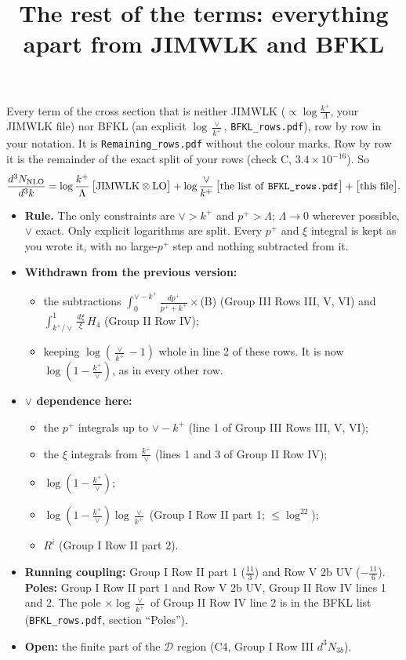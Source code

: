 \documentclass[10pt]{article}
\title{The rest of the terms: everything apart from JIMWLK and BFKL}
\date{}
\numberwithin{equation}{section}
\begin{document}
\maketitle
\noindent Every term of the cross section that is neither JIMWLK ($\propto\log\frac{k^+}{\Lambda}$, your JIMWLK file) nor BFKL (an explicit $\log\frac{\vee}{k^+}$, \texttt{BFKL\_rows.pdf}), row by row in your notation. It is \texttt{Remaining\_rows.pdf} without the colour marks. Row by row it is the remainder of the exact split of your rows (check C, $3.4\times10^{-16}$). So
\begin{equation*}
\frac{d^3N_{\rm NLO}}{d^3k}=\log\frac{k^+}{\Lambda}\,\big[\text{JIMWLK}\otimes\text{LO}\big]+\log\frac{\vee}{k^+}\,\big[\text{the list of \texttt{BFKL\_rows.pdf}}\big]+\big[\text{this file}\big].
\end{equation*}
\begin{itemize}
\item \textbf{Rule.} The only constraints are $\vee>k^+$ and $p^+>\Lambda$; $\Lambda\to0$ wherever possible, $\vee$ exact. Only explicit logarithms are split. Every $p^+$ and $\xi$ integral is kept as you wrote it, with no large-$p^+$ step and nothing subtracted from it.
\item \textbf{Withdrawn from the previous version:}
\begin{itemize}
\item the subtractions $\int_0^{\vee-k^+}\frac{dp^+}{p^++k^+}\times$(B) (Group III Rows III, V, VI) and $\int_{k^+/\vee}^1\frac{d\xi}{\xi}\,H_4$ (Group II Row IV);
\item keeping $\log(\frac{\vee}{k^+}-1)$ whole in line 2 of these rows. It is now $\log(1-\frac{k^+}{\vee})$, as in every other row.
\end{itemize}
\item \textbf{$\vee$ dependence here:}
\begin{itemize}
\item the $p^+$ integrals up to $\vee-k^+$ (line 1 of Group III Rows III, V, VI);
\item the $\xi$ integrals from $\frac{k^+}{\vee}$ (lines 1 and 3 of Group II Row IV);
\item $\log(1-\frac{k^+}{\vee})$;
\item $\log(1-\frac{k^+}{\vee})\log\frac{\vee}{k^+}$ (Group I Row II part 1; $\le\log^22$);
\item $R^i$ (Group I Row II part 2).
\end{itemize}
\item \textbf{Running coupling:} Group I Row II part 1 ($\frac{11}{3}$) and Row V 2b UV ($-\frac{11}{6}$). \textbf{Poles:} Group I Row II part 1 and Row V 2b UV, Group II Row IV lines 1 and 2. The pole $\times\log\frac{\vee}{k^+}$ of Group II Row IV line 2 is in the BFKL list (\texttt{BFKL\_rows.pdf}, section ``Poles'').
\item \textbf{Open:} the finite part of the $\mathcal D$ region (C4, Group I Row III $d^3N_{3b}$).
\end{itemize}
\end{document}
